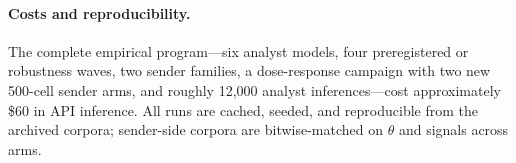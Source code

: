 \documentclass[11pt]{article}
\theoremstyle{remark}
\begin{document}
\begin{appendices}
\paragraph{Costs and reproducibility.} The complete empirical program---six analyst models, four preregistered or robustness waves, two sender families, a dose-response campaign with two new 500-cell sender arms, and roughly 12{,}000 analyst inferences---cost approximately \$60 in API inference. All runs are cached, seeded, and reproducible from the archived corpora; sender-side corpora are bitwise-matched on $\theta$ and signals across arms.

\end{appendices}
\end{document}
